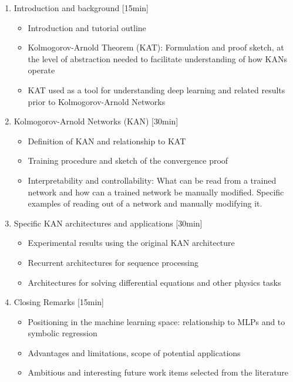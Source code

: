 \documentclass{ecai}
\begin{document}
\begin{enumerate}
\item Introduction and background [15min]
  \begin{itemize}
  \item Introduction and tutorial outline
  \item Kolmogorov-Arnold Theorem (KAT):
    Formulation and proof sketch, at the level of abstraction
    needed to facilitate understanding of how KANs operate
  \item KAT used as a tool for understanding deep learning
    and related results prior to Kolmogorov-Arnold Networks
  \end{itemize}
\item Kolmogorov-Arnold Networks (KAN) [30min]
  \begin{itemize}
  \item Definition of KAN and relationship to KAT
  \item Training procedure and sketch of the convergence proof
  \item Interpretability and controllability: What can be read from a
    trained network and how can a trained network be manually
    modified. Specific examples of reading out of a network and manually
    modifying it.
  \end{itemize}
  \filbreak
\item Specific KAN architectures and applications [30min]
  \begin{itemize}
  \item Experimental results using the original KAN architecture 
  \item Recurrent architectures for sequence processing
  \item Architectures for solving differential equations and other
    physics tasks
  \end{itemize}
\item Closing Remarks [15min]
  \begin{itemize}
  \item Positioning in the machine learning space:
    relationship to MLPs and to symbolic regression
  \item Advantages and limitations, scope of potential applications
  \item Ambitious and interesting future work items selected from the
    literature
  \end{itemize}
\end{enumerate}
    
\end{document}
